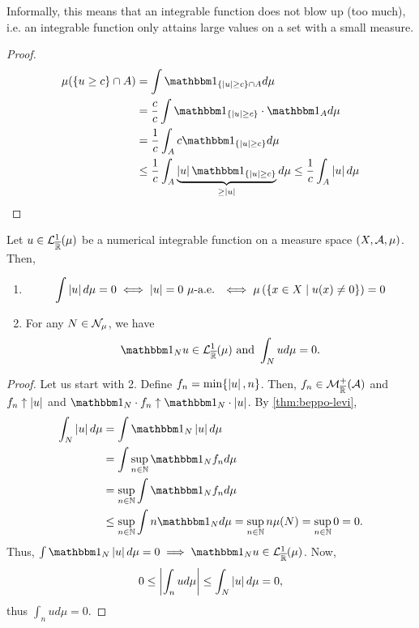 Informally, this means that an integrable function does not blow up (too much), i.e. an integrable function only attains large values on a set with a small measure.

\begin{proof}
	\begin{align*}
		\mu(\{u \geq c\} \cap A)
		&= \int \ind_{\{\abs{u} \geq c\} \cap A} d\mu \\
		&= \frac{c}{c} \int \ind_{\{\abs{u} \geq c\}} \cdot \ind_A d\mu\\
		&= \frac{1}{c} \int_A c \ind_{\{\abs{u} \geq c\}} d\mu\\
		&\leq \frac{1}{c} \int_A \underbrace{\abs{u}\ind_{\{\abs{u} \geq c\}}}_{\geq \abs{u}} d\mu
		\leq \frac{1}{c} \int_A \abs{u} d\mu
	\end{align*}
\end{proof}

\begin{thm}
	\label{thm:null-integral-ae}
	Let $u \in \mathcal{L}_{\overline{\mathbb{R}}}^1(\mu)$ be a numerical integrable function on a measure space $(X, \mathcal{A}, \mu)$. Then,
	\begin{enumerate}
		\item
		\begin{align}
			\int \left\vert{u}\right\vert d\mu = 0 \iff \left\vert{u}\right\vert = 0 \ \mu\text{-a.e. } \iff \mu\left(\left\{ x \in X \mid u(x) \neq 0 \right\}\right) = 0
		\end{align}
		\item For any $N \in \mathcal{N}_\mu$, we have
		\begin{align}
			\ind_N u \in \calL^1_\Rb(\mu) \text{ and }\int_N u d\mu = 0.
		\end{align}
	\end{enumerate}
\end{thm}

\begin{proof}
	Let us start with 2. Define $f_n = \min\{ \left\vert{u}\right\vert, n\}$. Then, $f_n \in \mathcal{M}_{\overline{\mathbb{R}}}^+(\mathcal{A})$ and $f_n \uparrow \left\vert{u}\right\vert$ and $\ind_N \cdot f_n \uparrow \ind_N \cdot \abs{u}$. By \autoref{thm:beppo-levi}, 
	\begin{align*}
		\int_N \abs{u} d\mu
		&= \int \ind_N \abs{u}d\mu\\
		&= \int \sup_{n\in \N} \ind_N f_n d\mu\\
		&= \sup_{n\in\N} \int \ind_N f_n d\mu\\
		&\leq \sup_{n\in \N} \int n \ind_N d\mu = \sup_{n\in\N} n \mu(N) = \sup_{n\in\N} 0 = 0.
	\end{align*}
	Thus, $\int \ind_N \abs{u} d\mu = 0 \implies \ind_N u \in  \calL_\Rb^1(\mu)$. Now,
	\begin{align*}
		0 \leq \left\vert{ \int_n u d\mu }\right\vert \leq \int_N \left\vert{u}\right\vert d\mu = 0,
	\end{align*}
	thus $\int_n u d\mu = 0$.
\end{proof}

